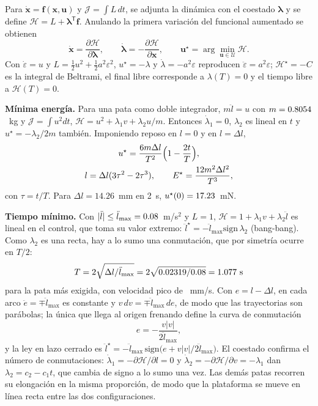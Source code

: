 \documentclass[conference]{IEEEtran}
\newcommand{\vect}[1]{\bm{#1}}
\newcommand{\T}{^{\mathsf{T}}}
\begin{document}
Para $\dot{\vect x} = \vect f(\vect x, \vect u)$ y $\mathcal J = \int L\,dt$, se adjunta la dinámica con el coestado $\boldsymbol\lambda$ y se define $\mathcal H = L + \boldsymbol\lambda\T\vect f$. Anulando la primera variación del funcional aumentado se obtienen \cite{kirk1970}
\begin{equation}
\dot{\vect x} = \frac{\partial\mathcal H}{\partial\boldsymbol\lambda},\qquad \dot{\boldsymbol\lambda} = -\frac{\partial\mathcal H}{\partial\vect x},\qquad \vect u^\star = \arg\min_{\vect u\in\mathcal U}\mathcal H .
\end{equation}
Con $\dot\varepsilon = u$ y $L = \frac12u^2 + \frac12a^2\varepsilon^2$, $u^\star = -\lambda$ y $\dot\lambda = -a^2\varepsilon$ reproducen $\ddot\varepsilon = a^2\varepsilon$; $\mathcal H^\star = -C$ es la integral de Beltrami, el final libre corresponde a $\lambda(T) = 0$ y el tiempo libre a $\mathcal H(T) = 0$.

\textbf{Mínima energía.} Para una pata como doble integrador, $m\ddot l = u$ con $m = 0.8054$~kg y $\mathcal J = \int u^2dt$, $\mathcal H = u^2 + \lambda_1v + \lambda_2u/m$. Entonces $\dot\lambda_1 = 0$, $\lambda_2$ es lineal en $t$ y $u^\star = -\lambda_2/2m$ también. Imponiendo reposo en $l = 0$ y en $l = \Delta l$,
\begin{gather}
u^\star = \frac{6m\Delta l}{T^2}\Bigl(1 - \frac{2t}{T}\Bigr),\nonumber\\ l = \Delta l(3\tau^2 - 2\tau^3),\qquad E^\star = \frac{12m^2\Delta l^2}{T^3},
\end{gather}
con $\tau = t/T$. Para $\Delta l = 14.26$~mm en 2~s, $u^\star(0) = 17.23$~mN.

\textbf{Tiempo mínimo.} Con $|\ddot l| \le \ddot l_{\max} = 0.08$~m/s$^2$ y $L = 1$, $\mathcal H = 1 + \lambda_1v + \lambda_2\ddot l$ es lineal en el control, que toma su valor extremo: $\ddot l^\star = -\ddot l_{\max}\mathrm{sign}\,\lambda_2$ (bang-bang). Como $\lambda_2$ es una recta, hay a lo sumo una conmutación, que por simetría ocurre en $T/2$:
\begin{equation}
T = 2\sqrt{\Delta l/\ddot l_{\max}} = 2\sqrt{0.02319/0.08} = 1.077\ \text{s}
\end{equation}
para la pata más exigida, con velocidad pico de \vPico~mm/s. Con $e = l - \Delta l$, en cada arco $\ddot e = \mp\ddot l_{\max}$ es constante y $v\,dv = \mp\ddot l_{\max}\,de$, de modo que las trayectorias son parábolas; la única que llega al origen frenando define la curva de conmutación
\begin{equation}
e = -\frac{v\lvert v\rvert}{2\ddot l_{\max}},
\end{equation}
y la ley en lazo cerrado es $\ddot l^\star = -\ddot l_{\max}\,\mathrm{sign}\bigl(e + v\lvert v\rvert/2\ddot l_{\max}\bigr)$. El coestado confirma el número de conmutaciones: $\dot\lambda_1 = -\partial\mathcal H/\partial l = 0$ y $\dot\lambda_2 = -\partial\mathcal H/\partial v = -\lambda_1$ dan $\lambda_2 = c_2 - c_1t$, que cambia de signo a lo sumo una vez. Las demás patas recorren su elongación en la misma proporción, de modo que la plataforma se mueve en línea recta entre las dos configuraciones.
\end{document}
